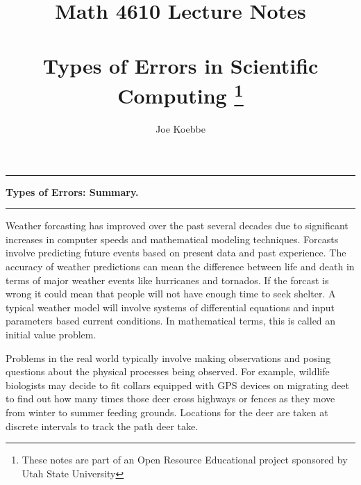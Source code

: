 \documentclass[10pt,fleqn]{article}
\title{Math 4610 Lecture Notes \\
            \ \\
       Types of Errors in Scientific Computing
  \footnote{These notes are part of an Open Resource Educational project
            sponsored by Utah State University}}
\author{Joe Koebbe}
\begin{document}
\maketitle
\newpage
\vskip0.1in\hrule\vskip0.1in
\noindent
{\bf Types of Errors: Summary.} 
\vskip0.1in\hrule\vskip0.1in
\noindent
Weather forcasting has improved over the past several decades due to significant
increases in computer speeds and mathematical modeling techniques. Forcasts
involve predicting future events based on present data and past experience. The
accuracy of weather predictions can mean the difference between life and death
in terms of major weather events like hurricanes and tornados. If the forcast is
wrong it could mean that people will not have enough time to seek shelter. A
typical weather model will involve systems of differential equations and input
parameters based current conditions. In mathematical terms, this is called an
initial value problem. 

Problems in the real world typically involve making observations and posing
questions about the physical processes being observed. For example, wildlife
biologists may decide to fit collars equipped with GPS devices on migrating deet
to find out how many times those deer cross highways or fences as they move
from winter to summer feeding grounds. Locations for the deer are taken at 
discrete intervals to track the path deer take.  
\end{document}
